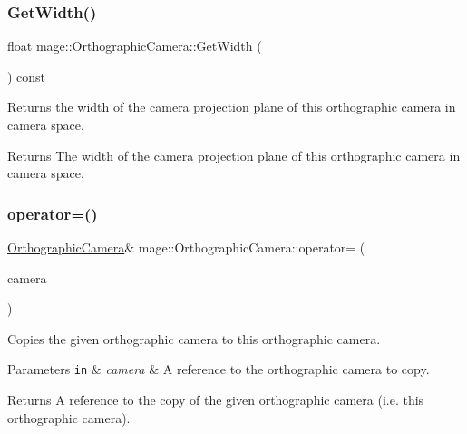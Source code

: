 \subsubsection{\texorpdfstring{Get\+Width()}{GetWidth()}}
{\footnotesize\ttfamily float mage\+::\+Orthographic\+Camera\+::\+Get\+Width (\begin{DoxyParamCaption}{ }\end{DoxyParamCaption}) const}

Returns the width of the camera projection plane of this orthographic camera in camera space.

\begin{DoxyReturn}{Returns}
The width of the camera projection plane of this orthographic camera in camera space. 
\end{DoxyReturn}
\hypertarget{classmage_1_1_orthographic_camera_a38631b1c377f0e3b6fa99ac5535ce226}{}\label{classmage_1_1_orthographic_camera_a38631b1c377f0e3b6fa99ac5535ce226} 
\subsubsection{\texorpdfstring{operator=()}{operator=()}\hspace{0.1cm}{\footnotesize\ttfamily [1/2]}}
{\footnotesize\ttfamily \hyperlink{classmage_1_1_orthographic_camera}{Orthographic\+Camera}\& mage\+::\+Orthographic\+Camera\+::operator= (\begin{DoxyParamCaption}\item[{const \hyperlink{classmage_1_1_orthographic_camera}{Orthographic\+Camera} \&}]{camera }\end{DoxyParamCaption})\hspace{0.3cm}{\ttfamily [default]}}

Copies the given orthographic camera to this orthographic camera.


\begin{DoxyParams}[1]{Parameters}
\mbox{\tt in}  & {\em camera} & A reference to the orthographic camera to copy. \\
\hline
\end{DoxyParams}
\begin{DoxyReturn}{Returns}
A reference to the copy of the given orthographic camera (i.\+e. this orthographic camera). 
\end{DoxyReturn}
\hypertarget{classmage_1_1_orthographic_camera_a51b38eab8945fb1a2031a7ba1755d689}{}\label{classmage_1_1_orthographic_camera_a51b38eab8945fb1a2031a7ba1755d689} 

